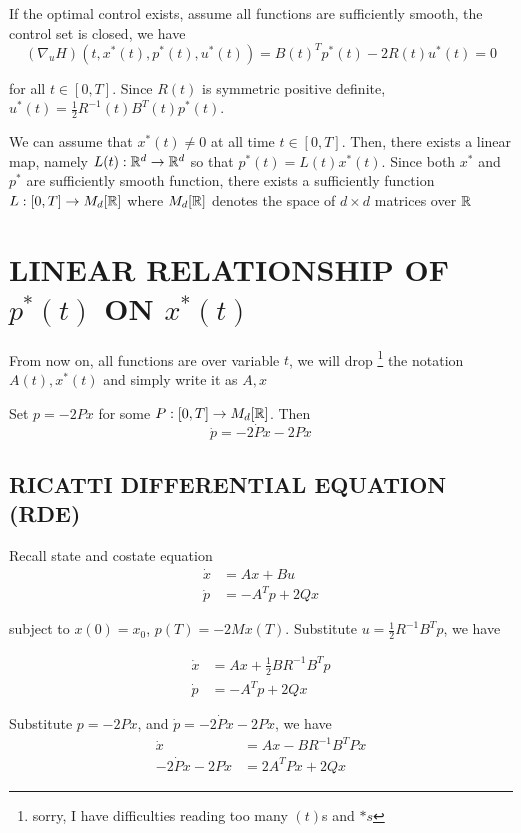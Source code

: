 If the optimal control exists, assume all functions are sufficiently smooth, the control set is closed, we have
$$
	(\nabla_u H)(t, x^*(t), p^*(t), u^*(t)) = B(t)^T p^*(t) - 2 R(t) u^*(t) = 0
$$

for all $t \in [0, T]$. Since $R(t)$ is symmetric positive definite, $u^*(t) = \frac{1}{2} R^{-1}(t) B^T(t) p^*(t)$.

We can assume that $x^*(t) \neq 0$ at all time $t \in [0, T]$. Then, there exists a linear map, namely $L(t): \mathbb{R}^d \to \mathbb{R}^d$ so that $p^*(t) = L(t) x^*(t)$. Since both $x^*$ and $p^*$ are sufficiently smooth function, there exists a sufficiently function $L: [0, T] \to M_d[\mathbb{R}]$ where $M_d[\mathbb{R}]$ denotes the space of $d \times d$ matrices over $\mathbb{R}$

\section{LINEAR RELATIONSHIP OF $p^*(t)$ ON $x^*(t)$}

From now on, all functions are over variable $t$, we will drop \footnote{sorry, I have difficulties reading too many $(t)$s and $*s$} the notation $A(t), x^*(t)$ and simply write it as $A, x$

Set $p = -2Px$ for some $P: [0, T] \to M_d[\mathbb{R}]$. Then
$$
	\dot{p} = - 2 \dot{P} x - 2 P \dot{x}
$$

\subsection{RICATTI DIFFERENTIAL EQUATION (RDE)}

Recall state and costate equation
\begin{align*}
	\dot{x} &= Ax + Bu \\
	\dot{p} &= -A^T p + 2Qx
\end{align*}

subject to $x(0) = x_0$, $p(T) = -2Mx(T)$. Substitute $u = \frac{1}{2} R^{-1} B^T p$, we have

\begin{align*}
	\dot{x} &= Ax + \frac{1}{2} B R^{-1} B^T p \\
	\dot{p} &= -A^T p + 2Qx
\end{align*}


Substitute $p = -2Px$, and $\dot{p} = - 2 \dot{P} x - 2 P \dot{x}$, we have
\begin{align*}
	\dot{x} &= Ax - B R^{-1} B^T Px \\
	- 2 \dot{P} x - 2 P \dot{x} &= 2 A^T Px + 2Qx
\end{align*}

